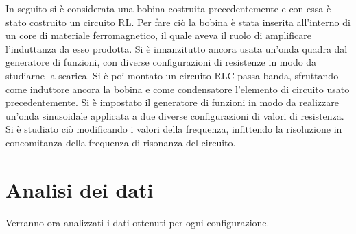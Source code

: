 \documentclass{article}
\begin{document}
In seguito si è considerata una bobina costruita precedentemente e con essa è stato costruito un circuito RL. Per fare ciò la bobina è stata inserita all'interno di un core di materiale ferromagnetico, il quale aveva il ruolo di amplificare l'induttanza da esso prodotta. Si è innanzitutto ancora usata un'onda quadra dal generatore di funzioni, con diverse configurazioni di resistenze in modo da studiarne la scarica. Si è poi montato un circuito RLC passa banda, sfruttando come induttore ancora la bobina e come condensatore l'elemento di circuito usato precedentemente. Si è impostato il generatore di funzioni in modo da realizzare un'onda sinusoidale applicata a due diverse configurazioni di valori di resistenza. Si è studiato ciò modificando i valori della frequenza, infittendo la risoluzione in concomitanza della frequenza di risonanza del circuito. \\

\newpage

\section{Analisi dei dati}

Verranno ora analizzati i dati ottenuti per ogni configurazione.

\end{document}
